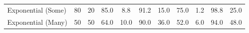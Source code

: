 \begin{table}[htbp]
{\begin{tabular}{|l|cc|cccc|cccc|}
Exponential (Some) & 80 & 20 & \cellcolor[RGB]{76,255,0}85.0 & \cellcolor[RGB]{44,255,0}8.8 & \cellcolor[RGB]{44,255,0}91.2 & \cellcolor[RGB]{76,255,0}15.0 & \cellcolor[RGB]{127,255,0}75.0 & \cellcolor[RGB]{6,255,0}1.2 & \cellcolor[RGB]{6,255,0}98.8 & \cellcolor[RGB]{127,255,0}25.0 \\
Exponential (Many) & 50 & 50 & \cellcolor[RGB]{183,255,0}64.0 & \cellcolor[RGB]{50,255,0}10.0 & \cellcolor[RGB]{50,255,0}90.0 & \cellcolor[RGB]{183,255,0}36.0 & \cellcolor[RGB]{244,255,0}52.0 & \cellcolor[RGB]{30,255,0}6.0 & \cellcolor[RGB]{30,255,0}94.0 & \cellcolor[RGB]{244,255,0}48.0 \\
\hline
\end{tabular}
}%
\end{table}
